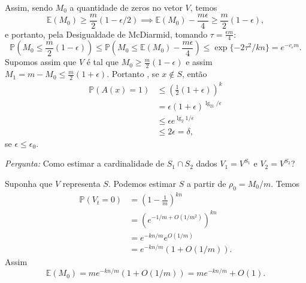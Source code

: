 Assim, sendo $M_0$ a quantidade de zeros no vetor $V$,
temos
\[\mathbb{E}(M_0)\ge \frac{m}{2} (1-\epsilon/2) \implies
\mathbb{E}(M_0)-\frac{m\epsilon}{4}\ge \frac{m}{2} (1-\epsilon),\]
e portanto, pela Desigualdade de McDiarmid, tomando $\tau = \frac{\epsilon m}{4}$:
\[
    \mathbb{P}(M_0 \le \frac{m}{2} (1-\epsilon)) 
    \le  
    \mathbb{P}\left(M_0
    \le 
    \mathbb{E}(M_0)-\frac{m\epsilon}{4}\right)
    \le 
    \exp\{-2\tau^2/kn\} 
    =
    e^{-c_\epsilon m}.\]
Supomos assim que $V$ \'e tal que $M_0\ge \frac{m}{2}(1-\epsilon)$ e assim $M_1 = m-M_0 \le \frac{m}{2}(1+\epsilon)$. 
Portanto , se $x\notin S$, ent\~ao 
\begin{align*}
\mathbb{P}(A(x)=1) &\le \left( \frac{1}{2} (1+\epsilon)\right)^k\\
					&=\epsilon(1+\epsilon)^{\lg_21/\epsilon}\\
					&\le \epsilon e^{\lg_2 1/\epsilon}\\
					&\le 2\epsilon = \delta,
\end{align*}
se $\epsilon \le \epsilon_0$.

\textit{Pergunta:} Como estimar a cardinalidade de $S_1\cap S_2$ dados $V_1=V^{S_1}$ e $V_2=V^{S_2}$?

Suponha que $V$ representa $S$. Podemos estimar $S$ a partir de $\rho_0 = M_0/m$.
Temos
\begin{align*}
\mathbb{P}(V_t=0)&= \left(1-\frac{1}{m}\right)^{kn}\\
                    &= \left(e^{-1/m+O(1/m^2)}\right)^{kn}\\
                    &=e^{-kn/m}e^{O({1/m})}\\
                    &=e^{-kn/m}(1+O(1/m)).
\end{align*} 
Assim
\[\mathbb{E}(M_0) = me^{-kn/m}(1+O(1/m))=me^{-kn/m} + O(1).\]

